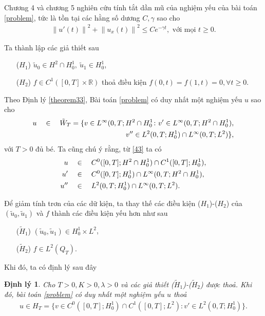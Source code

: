 \documentclass[12pt,a4paper]{article}
\def\R{\mathbb{R}}
\newtheorem{theorem}{Định lý}[section]
\theoremstyle{definition}
\theoremstyle{definition}
\begin{document}
Chương 4 và chương 5 nghiên cứu tính tắt dần mũ của nghiệm yếu của bài toán \eqref{problem}, tức là tồn tại các hằng số dương $C, \gamma$ sao cho
\begin{align}
    \left\|u'(t)\right\|^2 + \left\|u_x(t)\right\|^2 \le C e^{-\gamma t}, \text{ với mọi } t \ge 0.
\end{align}

Ta thành lập các giả thiết sau
\begin{enumerate}
    \item[($H_1$)] $\tilde{u}_0 \in H^2 \cap H^1_0,\ \tilde{u}_1 \in H^1_0$,
    \item[($H_2$)] $f \in C^1([0,T] \times \R)$ thoả điều kiện $f(0,t) = f(1,t) = 0, \forall t \ge 0$.
\end{enumerate}

Theo Định lý \ref{theorem33}, Bài toán \eqref{problem} có duy nhất một nghiệm yếu $u$ sao cho
\begin{align} \label{43}
    u \quad \in \quad \tilde{W}_T = \{ v \in L^\infty(0,T;H^2 \cap H^1_0 \colon v' \in L^\infty(0,T;H^2 \cap H^1_0), \\
    v'' \in L^2(0,T;H^1_0) \cap L^\infty(0,T;L^2) \}, \notag
\end{align}
với $T > 0$ đủ bé. Ta cũng chú ý rằng, từ \eqref{43} ta có
\begin{align}
    u \quad &\in \quad C^0([0,T]; H^2 \cap H^1_0) \cap C^1([0,T];H^1_0), \\
    u' \quad &\in \quad C^0([0,T]; H^1_0) \cap L^\infty(0,T; H^2 \cap H^1_0), \notag \\
    u'' \quad &\in \quad L^2(0,T;H^1_0) \cap L^\infty(0,T; L^2). \notag
\end{align}

Để giảm tính trơn của các dữ kiện, ta thay thế các điều kiện ($H_1$)-($H_2$) của $(\tilde{u}_0, \tilde{u}_1)$ và $f$ thành các điều kiện yếu hơn như sau
\begin{enumerate}
    \item[($\tilde{H}_1$)] $(\tilde{u}_0, \tilde{u}_1) \in H^1_0 \times L^2$,
    \item[($\tilde{H}_2$)] $f \in L^2(Q_T)$.
\end{enumerate}

Khi đó, ta có định lý sau đây

\begin{theorem} \label{theorem41}
    Cho $T > 0, K > 0, \lambda > 0$ và các giả thiết ($\tilde{H}_1$)-($\tilde{H}_2$) được thoả. Khi đó, bài toán \eqref{problem} có duy nhất một nghiệm yếu $u$ thoả
    \begin{align}
        u \in H_T = \{ v \in C^0([0,T];H^1_0) \cap C^1([0,T];L^2) \colon v' \in L^2(0,T;H^1_0) \}.
    \end{align}
\end{theorem}
\end{document}

